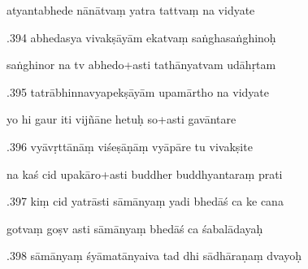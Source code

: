 \documentclass[article,12pt,a4paper]{memoir}%
\newcounter{parCount}
\begin{document}
	  
	  \pstart \leavevmode%
	atyantabhede nānātvaṃ yatra tattvaṃ na vidyate 
	{}
	\pend%
      

	  
	  \pstart {}.394 abhedasya vivakṣāyām ekatvaṃ saṅghasaṅghinoḥ 
	{}
	\pend%
      

	  
	  \pstart \leavevmode%
	saṅghinor na tv abhedo+asti tathānyatvam udāhṛtam 
	{}
	\pend%
      

	  
	  \pstart {}.395 tatrābhinnavyapekṣāyām upamārtho na vidyate 
	{}
	\pend%
      

	  
	  \pstart \leavevmode%
	yo hi gaur iti vijñāne hetuḥ so+asti gavāntare 
	{}
	\pend%
      

	  
	  \pstart {}.396 vyāvṛttānāṃ viśeṣāṇāṃ vyāpāre tu vivakṣite 
	{}
	\pend%
      

	  
	  \pstart \leavevmode%
	na kaś cid upakāro+asti buddher buddhyantaraṃ prati 
	{}
	\pend%
      

	  
	  \pstart {}.397 kiṃ cid yatrāsti sāmānyaṃ yadi bhedāś ca ke cana 
	{}
	\pend%
      

	  
	  \pstart \leavevmode%
	gotvaṃ goṣv asti sāmānyaṃ bhedāś ca śabalādayaḥ 
	{}
	\pend%
      

	  
	  \pstart {}.398 sāmānyaṃ śyāmatānyaiva tad dhi sādhāraṇaṃ dvayoḥ 
	{}
	\pend%
      
\end{document}

